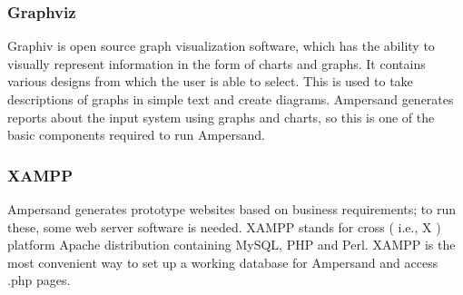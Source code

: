 \documentclass[12pt]{report}
\begin{document}
\subsubsection*{Graphviz}
Graphiv is open source graph visualization software, which has the ability to
visually represent information in the form of charts and graphs. It contains
various designs from which the user is able to select. This is used to take
descriptions of graphs in simple text and create diagrams. Ampersand generates
reports about the input system using graphs and charts, so this is one of the
basic components required to run Ampersand.

\subsubsection*{XAMPP}
Ampersand generates prototype websites based on business requirements; to run
these, some web server software is needed. XAMPP stands for cross \big( i.e., X
\big) platform Apache distribution containing MySQL, PHP and Perl. XAMPP \cite{xampp} is the
most convenient way to set up a working database for Ampersand and access .php
pages. 

%
\end{document}
